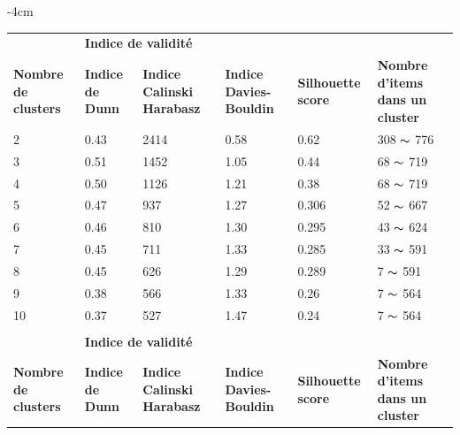 \newpage

\vspace{2em}
\begin{table}[H]
	\centering
	\addtolength{\leftskip} {-4cm}
	\addtolength{\rightskip}{-4.5cm}
	\begin{tabular}{|m{2cm}|m{2cm}|m{2cm}|m{2cm}|m{2cm}|m{3cm}|}
	\hline
	\rowcolor{blueforest}
	\multicolumn{6}{|m{16cm}|}{\centering \color{white} \textbf{Kmeans clustering} } \\ \hline
	&  \multicolumn{4}{|m{8cm}|}{\centering \textbf{Indice de validité} } & \\ \hline
	\textbf{Nombre de clusters}  &   \textbf{Indice de Dunn} & \textbf{Indice Calinski Harabasz}& \textbf{Indice Davies-Bouldin} & \textbf{Silhouette score}  &  \textbf{Nombre d'items dans un cluster }\\ \hline
	2  & 0.43  & \cellcolor{gray!40} 2414  & \cellcolor{gray!40} 0.58   &  \cellcolor{gray!40} 0.62   & 308  \(\displaystyle \thicksim  \) 776  \\ \hline %
	3  & \cellcolor{gray!40} 0.51  & 1452  & 1.05   &  0.44   & 68   \(\displaystyle \thicksim  \) 719  \\ \hline
	4  & 0.50  & 1126  & 1.21   &  0.38   & 68   \(\displaystyle \thicksim  \) 719  \\ \hline
	5  & 0.47  & 937   & 1.27   &  0.306  & 52   \(\displaystyle \thicksim  \) 667  \\ \hline
	6  & 0.46  & 810   & 1.30   &  0.295  & 43   \(\displaystyle \thicksim  \) 624  \\ \hline
	7  & 0.45  & 711   & 1.33   &  0.285  & 33   \(\displaystyle \thicksim  \) 591  \\ \hline
	8  & 0.45  & 626   & 1.29   &  0.289  & 7    \(\displaystyle \thicksim  \) 591  \\ \hline
	9  & 0.38  & 566   & 1.33   &  0.26   & 7    \(\displaystyle \thicksim  \) 564  \\ \hline
	10 & 0.37  & 527   & 1.47   &  0.24   & 7    \(\displaystyle \thicksim  \) 564  \\ \hline \hline
	\rowcolor{blueforest}
	\multicolumn{6}{|m{16cm}|}{\centering \color{white} \textbf{Agglomérative clustering} } \\ \hline
	&  \multicolumn{4}{|m{8cm}|}{\centering \textbf{Indice de validité} } & \\ \hline
	\textbf{Nombre de clusters}  &   \textbf{Indice de Dunn} & \textbf{Indice Calinski Harabasz}& \textbf{Indice Davies-Bouldin} & \textbf{Silhouette score}  &  \textbf{Nombre d'items dans un cluster }\\ \hline

\end{tabular}
\end{table}

